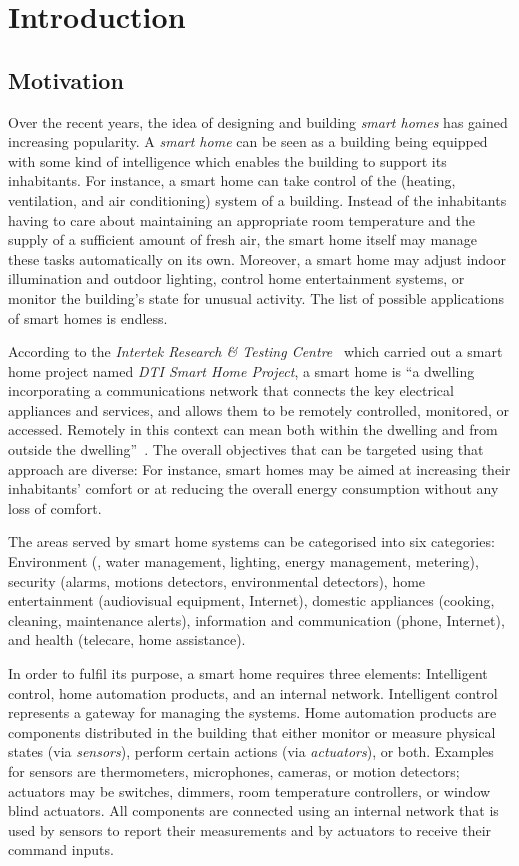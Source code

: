 \chapter{Introduction}
\label{ch:intro}

\section{Motivation}
\label{sec:motivation}

Over the recent years, the idea of designing and building \emph{smart homes} has gained increasing popularity. A \emph{smart home} can be seen as a building being equipped with some kind of intelligence which enables the building to support its inhabitants. For instance, a smart home can take control of the  (heating, ventilation, and air conditioning) system of a building. Instead of the inhabitants having to care about maintaining an appropriate room temperature and the supply of a sufficient amount of fresh air, the smart home itself may manage these tasks automatically on its own. Moreover, a smart home may adjust indoor illumination and outdoor lighting, control home entertainment systems, or monitor the building's state for unusual activity. The list of possible applications of smart homes is endless.

According to the \emph{Intertek Research \& Testing Centre}~\cite{intertek} which carried out a smart home project named \emph{DTI Smart Home Project}, a smart home is ``a dwelling incorporating a communications network that connects the key electrical appliances and services, and allows them to be remotely controlled, monitored, or accessed. Remotely in this context can mean both within the dwelling and from outside the dwelling''~\cite{SmartHomeDefinition,SmartHomeResearch}. The overall objectives that can be targeted using that approach are diverse: For instance, smart homes may be aimed at increasing their inhabitants' comfort or at reducing the overall energy consumption without any loss of comfort.

The areas served by smart home systems can be categorised into six categories: Environment (, water management, lighting, energy management, metering), security (alarms, motions detectors, environmental detectors), home entertainment (audiovisual equipment, Internet), domestic appliances (cooking, cleaning, maintenance alerts), information and communication (phone, Internet), and health (telecare, home assistance).

In order to fulfil its purpose, a smart home requires three elements: Intelligent control, home automation products, and an internal network. Intelligent control represents a gateway for managing the systems. Home automation products are components distributed in the building that either monitor or measure physical states (via \emph{sensors}), perform certain actions (via \emph{actuators}), or both. Examples for sensors are thermometers, microphones, cameras, or motion detectors; actuators may be switches, dimmers, room temperature controllers, or window blind actuators. All components are connected using an internal network that is used by sensors to report their measurements and by actuators to receive their command inputs.

